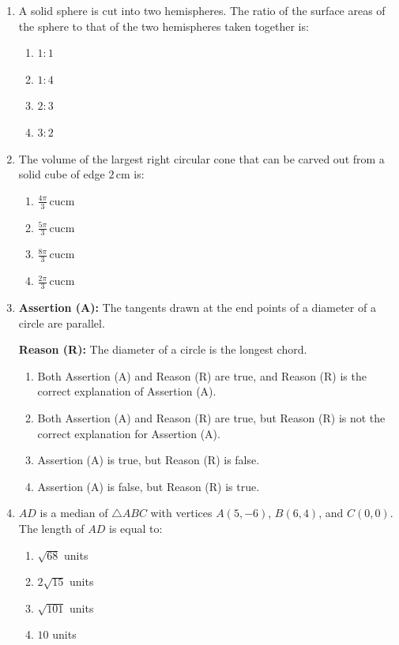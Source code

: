 
\begin{enumerate}


\item A solid sphere is cut into two hemispheres. The ratio of the surface areas of the sphere to that of the two hemispheres taken together is:
	\begin{enumerate}    
\item $1:1$
    \item $1:4$
    \item $2:3$
    \item $3:2$
	\end{enumerate}

\item The volume of the largest right circular cone that can be carved out from a solid cube of edge $2 \, \text{cm}$ is:
	\begin{enumerate}    
\item $\frac{4\pi}{3} \, \mathrm{cu cm}$
    \item $\frac{5\pi}{3} \, \mathrm{cu cm}$
    \item $\frac{8\pi}{3} \, \mathrm{cu cm}$
    \item $\frac{2\pi}{3} \, \mathrm{cu cm}$
	\end{enumerate}

\item \textbf{Assertion (A):} The tangents drawn at the end points of a diameter of a circle are parallel.

\textbf{Reason (R):} The diameter of a circle is the longest chord.
\begin{enumerate}
    \item Both Assertion (A) and Reason (R) are true, and Reason (R) is the correct explanation of Assertion (A).
    \item Both Assertion (A) and Reason (R) are true, but Reason (R) is not the correct explanation for Assertion (A).
    \item Assertion (A) is true, but Reason (R) is false.
    \item Assertion (A) is false, but Reason (R) is true.
\end{enumerate}

\item $AD$ is a median of $\triangle ABC$ with vertices $A(5, -6)$, $B(6, 4)$, and $C(0, 0)$. The length of $AD$ is equal to:
	\begin{enumerate}    
\item $\sqrt{68}$ units
    \item $2\sqrt{15}$ units
    \item $\sqrt{101}$ units
    \item $10$ units
	\end{enumerate}


\end{enumerate}
